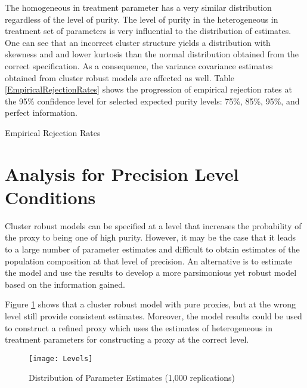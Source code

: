 \documentclass{jbsc}
\begin{document}
The homogeneous in treatment parameter has a very similar distribution regardless of the level of purity. The level of purity in the heterogeneous in treatment set of parameters is very influential to the distribution of estimates. One can see that an incorrect cluster structure yields a distribution with skewness and and lower kurtosis than the normal distribution obtained from the correct specification. As a consequence, the variance covariance estimates obtained from cluster robust models are affected as well. Table \ref{EmpiricalRejectionRates} shows the progression of empirical rejection rates at the 95\% confidence level for selected expected purity levels: 75\%, 85\%, 95\%, and perfect information.

\begin{table}[hbpt]
	\centering
	\caption{Empirical Rejection Rates}
	
	\label{EmpiricalRejectionRates}
\end{table}

\FloatBarrier
\section{Analysis for Precision Level Conditions}

Cluster robust models can be specified at a level that increases the probability of the proxy to being one of high purity. However, it may be the case that it leads to a large number of parameter estimates and difficult to obtain estimates of the population composition at that level of precision. An alternative is to estimate the model and use the results to develop a more parsimonious yet robust model based on the information gained.

Figure \ref{LowLevel} shows that a cluster robust model with pure proxies, but at the wrong level still provide consistent estimates. Moreover, the model results could be used to construct a refined proxy which uses the estimates of heterogeneous in treatment parameters for constructing a proxy at the correct level.

\begin{figure}[hbpt]
	\texttt{[image: Levels]}
	\caption{Distribution of Parameter Estimates (1,000 replications)}
	\label{LowLevel}
\end{figure}
\end{document}

